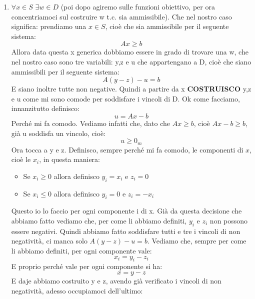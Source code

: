 \begin{enumerate}
    \item $\forall x \in S$ $\exists w \in D$ (poi dopo agiremo sulle funzioni obiettivo, per ora concentriamoci sul costruire w t.c. sia ammissibile). Che nel nostro caso significa: prendiamo una $x \in S$, cioè che sia ammissibile per il seguente sistema:
    \begin{equation*}
        Ax \geq b
    \end{equation*}
    Allora data questa x generica dobbiamo essere in grado di trovare una w, che nel nostro caso sono tre variabili: y,z e u che appartengano a D, cioè che siano ammissibili per il seguente sistema:
    \begin{equation*}
        A(y-z) - u = b
    \end{equation*}
    E siano inoltre tutte non negative. Quindi a partire da x \textbf{COSTRUISCO} y,z e u come mi sono comode per soddisfare i vincoli di D. Ok come facciamo, innanzitutto definisco:
    \begin{equation*}
        u = Ax - b
    \end{equation*}
    Perché mi fa comodo. Vediamo infatti che, dato che $Ax \geq b$, cioè $Ax - b \geq b$, già u soddisfa un vincolo, cioè:
    \begin{equation*}
        u \geq 0_m
    \end{equation*}
    Ora tocca a y e z. Definisco, sempre perché mi fa comodo, le componenti di $x$, cioè le $x_i$, in questa maniera:
    \begin{itemize}
        \item Se $x_i \geq 0$ allora definisco $y_i = x_i$ e $z_i = 0$
        \item Se $x_i \leq 0$ allora definisco $y_i = 0$ e $z_i = -x_i$
    \end{itemize}
    Questo io lo faccio per ogni componente i di x. Già da questa decisione che abbiamo fatto vediamo che, per come li abbiamo definiti, $y_i$ e $z_i$ non possono essere negativi. Quindi abbiamo fatto soddisfare tutti e tre i vincoli di non negatività, ci manca solo $A(y-z)-u = b$. Vediamo che, sempre per come li abbiamo definiti, per ogni componente vale:
    \begin{equation*}
        x_i = y_i - z_i
    \end{equation*}
    E proprio perché vale per ogni componente si ha:
    \begin{equation*}
        x = y - z
    \end{equation*}
    E daje abbiamo costruito y e z, avendo già verificato i vincoli di non negatività, adesso occupiamoci dell'ultimo:

\end{enumerate}

